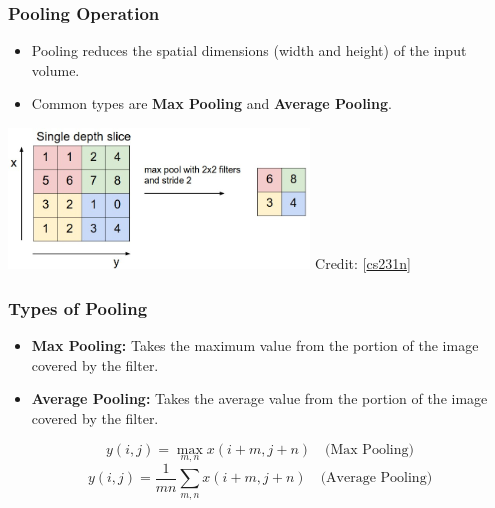 \documentclass[aspectratio=169]{../latex_main/tntbeamer}  %
\begin{document}
    \begin{frame}
    \frametitle{Pooling Operation}
    \begin{itemize}
        \item Pooling reduces the spatial dimensions (width and height) of the input volume.
        \item Common types are \textbf{Max Pooling} and \textbf{Average Pooling}.
    \end{itemize}
        \centering
        \includegraphics[width=0.6\textwidth]{figures/maxpool.jpeg} Credit: [\href{https://cs231n.github.io/convolutional-networks/#overview}{cs231n}]
    \end{frame}
    
    \begin{frame}
    \frametitle{Types of Pooling}
    \begin{itemize}
        \item \textbf{Max Pooling:} Takes the maximum value from the portion of the image covered by the filter.
        \item \textbf{Average Pooling:} Takes the average value from the portion of the image covered by the filter.
    \end{itemize}
    \begin{equation}
        y(i,j) = \max_{m,n} x(i+m,j+n) \quad \text{(Max Pooling)}
    \end{equation}
    \begin{equation}
        y(i,j) = \frac{1}{mn}\sum_{m,n} x(i+m,j+n) \quad \text{(Average Pooling)}
    \end{equation}
    \end{frame}
    
\end{document}
